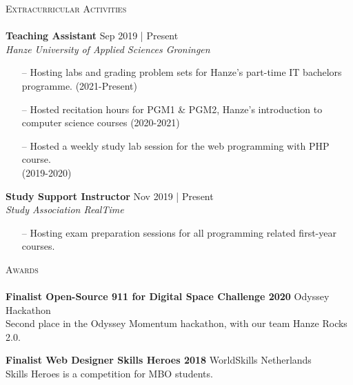 \documentclass[a4paper]{article}
\newcommand{\lineunder} {
    \vspace*{-8pt} \\
    \hspace*{-18pt} \hrulefill \\
}
\newcommand{\header} [1] {
    {\hspace*{-18pt}\vspace*{6pt} \textsc{#1}}
    \vspace*{-6pt} \lineunder
}
\begin{document}
\header{Extracurricular Activities}
\vspace{1mm}
\textbf{Teaching Assistant} \hfill \color{gray}Sep 2019 | Present\color{black}\\
\textit{Hanze University of Applied Sciences Groningen}\\
\vspace{-2mm}
\begin{itemize} \itemsep 1pt
	\item[--] Hosting labs and grading problem sets for Hanze’s part-time IT bachelors programme. \color{gray}(2021-Present)\color{black}
	\item[--] Hosted recitation hours for PGM1 & PGM2, Hanze’s introduction to computer science courses \color{gray}(2020-2021)\color{black}
	\item[--]Hosted a weekly study lab session for the web programming with PHP course.\\\color{gray}(2019-2020)\color{black}
\end{itemize}
\textbf{Study Support Instructor} \hfill \color{gray}Nov 2019 | Present\color{black}\\
\textit{Study Association RealTime}\\
\vspace{-2mm}
\begin{itemize} \itemsep 1pt
	\item[--] Hosting exam preparation sessions for all programming related first-year courses.
\end{itemize}

\vspace{2mm}

\vspace{5mm}

\header{Awards}
\textbf{Finalist Open-Source 911 for Digital Space Challenge 2020} \hfill Odyssey Hackathon\\
Second place in the Odyssey Momentum hackathon, with our team Hanze Rocks 2.0.
\vspace*{2mm}

\textbf{Finalist Web Designer Skills Heroes 2018} \hfill WorldSkills Netherlands\\
Skills Heroes is a competition for MBO students.
\vspace*{2mm}

\ 
\end{document}

